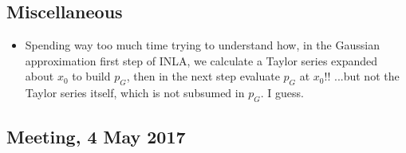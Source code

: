 \documentclass{article}
\begin{document}
\subsection*{Miscellaneous}
\begin{itemize}
\item Spending way too much time trying to understand how, in the Gaussian approximation first step of INLA, we calculate a Taylor series expanded about $x_{0}$ to build $p_{G}$, then in the next step evaluate $p_{G}$ at $x_{0}$!! ...but not the Taylor series itself, which is not subsumed in $p_{G}$. I guess.
\end{itemize}

\subsection*{Meeting, 4 May 2017}
\end{document}
